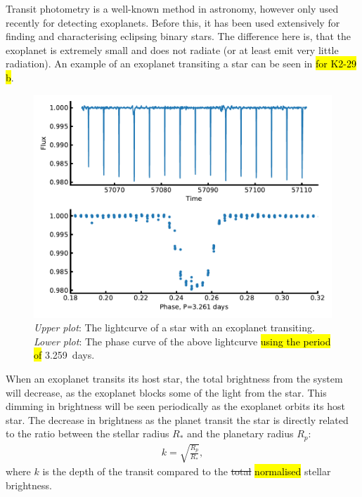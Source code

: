 Transit photometry is a well-known method in astronomy, however only used recently for detecting
exoplanets. Before this, it has been used extensively for finding and characterising eclipsing
binary stars. The difference here is, that the exoplanet is extremely small and does not radiate (or
at least emit very little radiation). An example of an exoplanet transiting a star can be seen in
 \hl{for K2-29 b}.

\begin{figure}[htpb!]
    \centering
    \includegraphics[width=1.0\linewidth]{figures/transitMethod.pdf}
    \caption{\emph{Upper plot}: The lightcurve of a star with an exoplanet transiting.
             \emph{Lower plot}: The phase curve of the above lightcurve \hl{using the period of}
             \SI{3.259}{days}.}
    \label{fig:transitMethod}
\end{figure}

When an exoplanet transits its host star, the total brightness from the system will decrease, as the
exoplanet blocks some of the light from the star. This dimming in brightness will be seen
periodically as the exoplanet orbits its host star. The decrease in brightness as the planet transit
the star is directly related to the ratio between the stellar radius $R_\ast$ and the planetary
radius $R_p$:
\begin{align}
  k = \sqrt{\frac{R_p}{R_\ast}},  \label{eq:transit}
\end{align}
where $k$ is the depth of the transit compared to the \st{total} \hl{normalised} stellar brightness.


